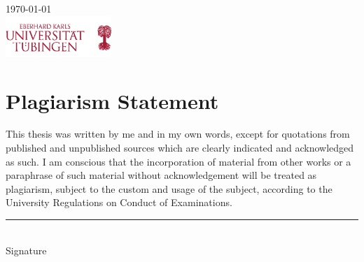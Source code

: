 \documentclass[a4paper, 12pt]{article}
\begin{document}
\begin{titlepage}


{\large \today}\\[1cm] %


\includegraphics[width=0.3\textwidth]{logo-uni-tuebingen.png}\\[1cm] %
 

\vfill %

\end{titlepage}
\section*{Plagiarism Statement} 
This thesis was written by me and in my own words, except for quotations from published and unpublished sources which are clearly indicated and acknowledged as such. I am conscious that the incorporation of material from other works or a paraphrase of such material without acknowledgement will be treated as plagiarism, subject to the custom and usage of the subject, according to the University Regulations on Conduct of Examinations.\\[5cm]
\noindent\rule{4cm}{0.4pt}\\
Signature
\newpage

\tableofcontents
\newpage
\end{document}
